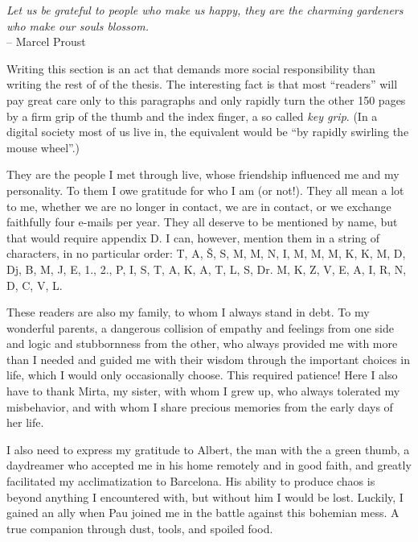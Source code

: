 \documentclass[a4paper,twoside,11pt]{report}
\begin{document}
\begin{myquote}
\begin{flushright}
\textit{Let us be grateful to people who make us happy, they are the charming gardeners who make our souls blossom.} \\-- Marcel Proust
\end{flushright}
\end{myquote}


Writing this section is an act that demands more social responsibility than writing the rest of of the thesis. The interesting fact is that most “readers” will pay great care only to this paragraphs and only rapidly turn the other 150 pages by a firm grip of the thumb and the index finger, a so called \emph{key grip}. (In a digital society most of us live in, the equivalent would be “by rapidly swirling the mouse wheel”.)

They are the people I met through live, whose friendship influenced me and my personality. To them I owe gratitude for who I am (or not!). They all mean a lot to me, whether we are no longer in contact, we are in contact, or we exchange faithfully four e-mails per year. They all deserve to be mentioned by name, but that would require appendix D. I can, however, mention them in a string of characters, in no particular order: T, A, Š, S, M, M, N, I, M, M, M, K, K, M, D, Dj, B, M, J, E, 1., 2., P, I, S, T, A, K, A, T, L, S, Dr. M, K, Z, V, E, A, I, R, N, D, C, V, L.

These readers are also my family, to whom I always stand in debt. To my wonderful parents, a dangerous collision of empathy and feelings from one side and logic and stubbornness from the other, who always provided me with more than I needed and guided me with their wisdom through the important choices in life, which I would only occasionally choose. This required patience! Here I also have to thank Mirta, my sister, with whom I grew up, who always tolerated my misbehavior, and with whom I share precious memories from the early days of her life. 

I also need to express my gratitude to Albert, the man with the a green thumb, a daydreamer who accepted me in his home remotely and in good faith, and greatly facilitated my acclimatization to Barcelona. His ability to produce chaos is beyond anything I encountered with, but without him I would be lost. Luckily, I gained an ally when Pau joined me in the battle against this bohemian mess. A true companion through dust, tools, and spoiled food.
\end{document}
